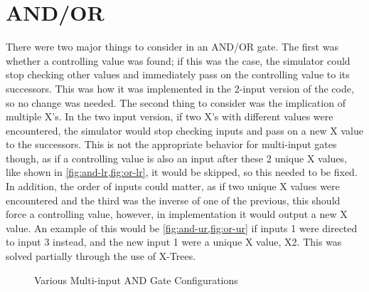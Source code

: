 \documentclass[12pt]{report}
\begin{document}
\section{AND/OR}\label{sec:and-or}

There were two major things to consider in an AND/OR gate. The first was whether a controlling value was found; if this was the case, the simulator could stop checking other values and immediately pass on the controlling value to its successors. This was how it was implemented in the 2-input version of the code, so no change was needed. The second thing to consider was the implication of multiple X's. In the two input version, if two X's with different values were encountered, the simulator would stop checking inputs and pass on a new X value to the successors. This is not the appropriate behavior for multi-input gates though, as if a controlling value is also an input after these 2 unique X values, like shown in \cref{fig:and-lr,fig:or-lr}, it would be skipped, so this needed to be fixed. In addition, the order of inputs could matter, as if two unique X values were encountered and the third was the inverse of one of the previous, this should force a controlling value, however, in implementation it would output a new X value. An example of this would be \cref{fig:and-ur,fig:or-ur} if inputs 1 were directed to input 3 instead, and the new input 1 were a unique X value, X2. This was solved partially through the use of X-Trees.

\begin{figure}[h!]	
	\centering
	
	\label{fig:and-group}
	\caption[Multi-input AND Gates]{Various Multi-input AND Gate Configurations}
\end{figure}
\end{document}
